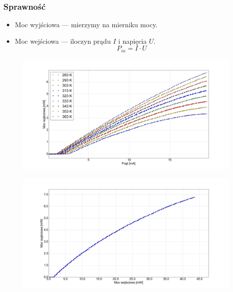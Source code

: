 \documentclass[xcolor={dvipsnames,table}]{beamer}
\begin{document}
\begin{frame}
\frametitle{Sprawność}
\begin{itemize}
\item Moc wyjściowa  ---  mierzymy na mierniku mocy.
\item Moc wejściowa --- iloczyn prądu $I$ i napięcia $U$.
\begin{equation*}
P_{in} = I \cdot U
\end{equation*}
\end{itemize}
\end{frame}

\begin{frame}
\center
\begin{figure}
   \includegraphics[width=1.10\textwidth,natwidth=69,natheight=87]{plot_all.png}
\end{figure}

\end{frame}


\begin{frame}
\center
\begin{figure}
   \includegraphics[width=1.10\textwidth,natwidth=69,natheight=87]{temp_10_power.png}
\end{figure}

\end{frame}
\end{document}
